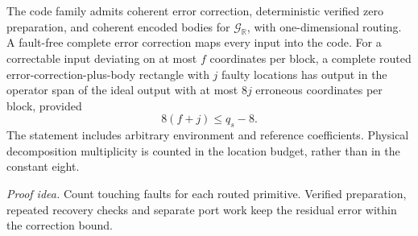 \begin{lemma}\label{d:gadgets}
The code family admits coherent error correction, deterministic verified
zero preparation, and coherent encoded bodies for
\(\mathcal G_{\mathbb R}\), with one-dimensional routing. A fault-free
complete error correction maps every input into the code. For a
correctable input deviating on at most \(f\) coordinates per block,
a complete routed error-correction-plus-body rectangle with \(j\)
faulty locations has output in the operator span of the ideal output
with at most \(8j\) erroneous coordinates per block, provided
\begin{equation}\label{d:margin}
 8(f+j)\le q_s-8.
\end{equation}
The statement includes arbitrary environment and reference coefficients.
Physical decomposition multiplicity is counted in the location budget,
rather than in the constant eight.
\end{lemma}
\par\noindent\emph{Proof idea.} Count touching faults for each routed primitive. Verified preparation, repeated recovery checks and separate port work keep the residual error within the correction bound.

